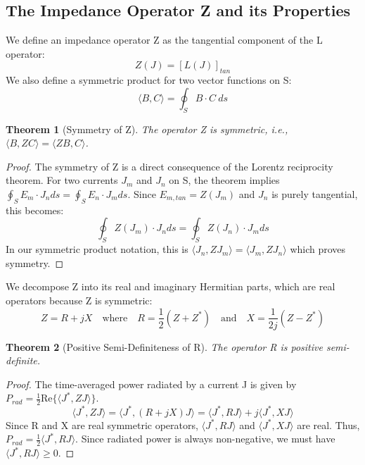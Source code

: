 \documentclass[11pt,a4paper]{article}
\newcommand{\avg}[1]{\langle #1 \rangle} %
\newtheorem{theorem}{Theorem}[section]
\begin{document}
\subsection{The Impedance Operator Z and its Properties}

We define an impedance operator Z as the tangential component of the L operator:
\begin{equation}
    Z(J)=[L(J)]_{tan}
\end{equation}
We also define a symmetric product for two vector functions on S:
\begin{equation}
    \avg{B,C}=\oint_{S}B\cdot C~ds
\end{equation}

\begin{theorem}[Symmetry of Z]
The operator Z is symmetric, i.e., \(\avg{B,ZC}=\avg{ZB,C}\).
\end{theorem}
\begin{proof}
The symmetry of Z is a direct consequence of the Lorentz reciprocity theorem. For two currents \(J_{m}\) and \(J_{n}\) on S, the theorem implies \(\oint_{S}E_{m}\cdot J_{n}ds=\oint_{S}E_{n}\cdot J_{m}ds\). Since \(E_{m,tan}=Z(J_{m})\) and \(J_{n}\) is purely tangential, this becomes:
\begin{equation}
    \oint_{S}Z(J_{m})\cdot J_{n}ds=\oint_{S}Z(J_{n})\cdot J_{m}ds
\end{equation}
In our symmetric product notation, this is \(\avg{ J_{n},ZJ_{m}}=\avg{ J_{m},ZJ_{n}}\) which proves symmetry.
\end{proof}

We decompose Z into its real and imaginary Hermitian parts, which are real operators because Z is symmetric:
\begin{equation}
    Z=R+jX \quad \text{where} \quad R=\frac{1}{2}(Z+Z^{*}) \quad \text{and} \quad X=\frac{1}{2j}(Z-Z^{*})
\end{equation}

\begin{theorem}[Positive Semi-Definiteness of R]
The operator R is positive semi-definite.
\end{theorem}
\begin{proof}
The time-averaged power radiated by a current J is given by \(P_{rad}=\frac{1}{2}\text{Re}\{\avg{ J^{*},ZJ}\}\).
\begin{equation}
    \avg{ J^{*},ZJ}=\avg{ J^{*},(R+jX)J}=\avg{ J^{*},RJ}+j\avg{ J^{*},XJ}
\end{equation}
Since R and X are real symmetric operators, \(\avg{ J^{*},RJ}\) and \(\avg{ J^{*},XJ}\) are real. Thus, \(P_{rad}=\frac{1}{2}\avg{ J^{*},RJ}\). Since radiated power is always non-negative, we must have \(\avg{ J^{*},RJ}\ge0\).
\end{proof}
\end{document}
